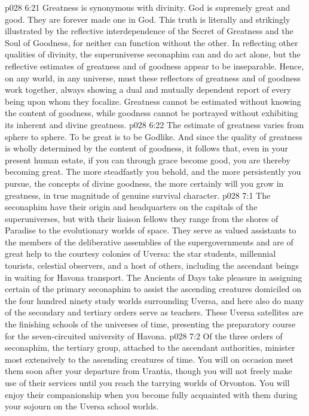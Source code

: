 \vs p028 6:21 Greatness is synonymous with divinity. God is supremely great and good.  They are forever made one in God. This truth is literally and strikingly illustrated by the reflective interdependence of the Secret of Greatness and the Soul of Goodness, for neither can function without the other. In reflecting other qualities of divinity, the superuniverse seconaphim can and do act alone, but the reflective estimates of greatness and of goodness appear to be inseparable. Hence, on any world, in any universe, must these reflectors of greatness and of goodness work together, always showing a dual and mutually dependent report of every being upon whom they focalize. Greatness cannot be estimated without knowing the content of goodness, while goodness cannot be portrayed without exhibiting its inherent and divine greatness.
\vs p028 6:22 The estimate of greatness varies from sphere to sphere. To be great is to be Godlike. And since the quality of greatness is wholly determined by the content of goodness, it follows that, even in your present human estate, if you can through grace become good, you are thereby becoming great. The more steadfastly you behold, and the more persistently you pursue, the concepts of divine goodness, the more certainly will you grow in greatness, in true magnitude of genuine survival character.\plusone
{}
\vs p028 7:1 The seconaphim have their origin and headquarters on the capitals of the superuniverses, but with their liaison fellows they range from the shores of Paradise to the evolutionary worlds of space. They serve as valued assistants to the members of the deliberative assemblies of the supergovernments and are of great help to the courtesy colonies of Uversa: the star students, millennial tourists, celestial observers, and a host of others, including the ascendant beings in waiting for Havona transport. The Ancients of Days take pleasure in assigning certain of the primary seconaphim to assist the ascending creatures domiciled on the four hundred ninety study worlds surrounding Uversa, and here also do many of the secondary and tertiary orders serve as teachers. These Uversa satellites are the finishing schools of the universes of time, presenting the preparatory course for the seven\hyp{}circuited university of Havona.
\pc \vs p028 7:2 Of the three orders of seconaphim, the tertiary group, attached to the ascendant authorities, minister most extensively to the ascending creatures of time. You will on occasion meet them soon after your departure from Urantia, though you will not freely make use of their services until you reach the tarrying worlds of Orvonton. You will enjoy their companionship when you become fully acquainted with them during your sojourn on the Uversa school worlds.
